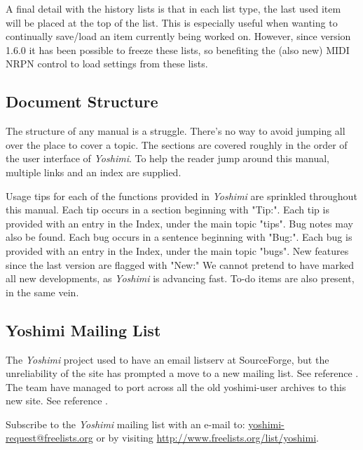 \documentclass[
 11pt,
 twoside,
 a4paper,
 final                                 %
]{article}
\begin{document}
   A final detail with the history lists is that in each list type, the last
   used item will be placed at the top of the list. This is especially useful
   when wanting to continually save/load an item currently being worked on.
   However, since version 1.6.0 it has been possible to freeze these lists, so
   benefiting the (also new) MIDI NRPN control to load settings from these lists.

\subsection{Document Structure}
\label{subsec:introduction_document_structure}

   The structure of any manual is a struggle.
   There's no way to avoid jumping all over the place to
   cover a topic.  The sections are covered roughly
   in the order of the user interface of
   \textsl{Yoshimi}.  To help the reader jump around this manual, multiple
   links and an index are supplied.

   Usage tips
   for each of the functions provided in
   \textsl{Yoshimi} are sprinkled throughout this manual.
   Each tip occurs in a section beginning with "Tip:".
   Each tip is provided with an entry in the Index, under the
   main topic "tips".
   Bug notes may also be found.
   Each bug occurs in a sentence beginning with "Bug:".  Each bug is
   provided with an entry in the Index, under the main topic "bugs".
   New features
   since the last version are flagged with "New:"  We cannot pretend to have
   marked all new developments, as \textsl{Yoshimi} is advancing fast.
   To-do items are also present, in the same vein.

\subsection{Yoshimi Mailing List}
\label{subsec:introduction_mailing_list}

   The \textsl{Yoshimi} project used to have an email listserv at
   SourceForge, but the unreliability of the site has prompted a move to a
   new mailing list.  See reference \cite{yoshiminews}.  The team have
   managed to port across all the old yoshimi-user archives to this new
   site.  See reference \cite{yoshiminewsarchive}.

   Subscribe to the \textsl{Yoshimi} mailing list with an e-mail to:
   \url{yoshimi-request@freelists.org} or by visiting
   \url{http://www.freelists.org/list/yoshimi}.
\end{document}
